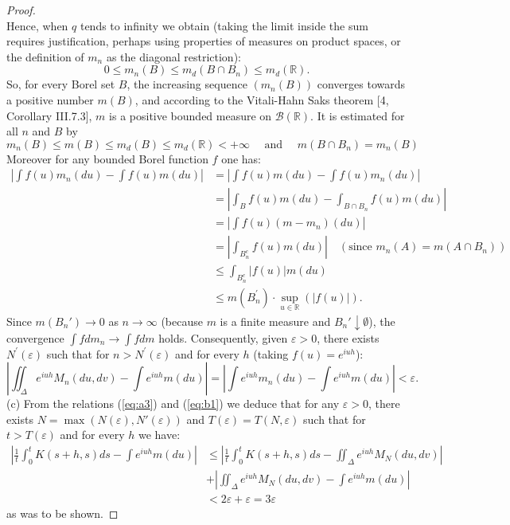 \documentclass{article}
\begin{document}
\begin{proof}
\[\]
Hence, when \(q\) tends to infinity we obtain (taking the limit inside the sum requires justification, perhaps using properties of measures on product spaces, or the definition of $m_n$ as the diagonal restriction):
\[
0 \leqslant m_{n}(B) \leqslant m_{d}\left(B \cap B_{n}\right) \leqslant m_{d}(\mathbb{R}) .
\]
So, for every Borel set \(B\), the increasing sequence \(\left(m_{n}(B)\right)\) converges towards a positive number \(m(B)\), and according to the Vitali-Hahn Saks theorem [4, Corollary III.7.3], \(m\) is a positive bounded measure on \(\mathscr{B}(\mathbb{R})\). It is estimated for all \(n\) and \(B\) by
\[
m_{n}(B) \leqslant m(B) \leqslant m_{d}(B) \leqslant m_{d}(\mathbb{R})<+\infty \quad \text { and } \quad m\left(B \cap B_{n}\right)=m_{n}(B)
\]
Moreover for any bounded Borel function \(f\) one has:
\[
\begin{aligned}
\left|\int f(u) m_{n}(d u)-\int f(u) m(d u)\right| & = \left|\int f(u) m(d u) - \int f(u) m_n(d u) \right| \\
& = \left| \int_{B} f(u) m(d u) - \int_{B \cap B_n} f(u) m(d u) \right| \\ %
& = \left| \int f(u) (m - m_n)(d u) \right| \\
& = \left| \int_{B_n^c} f(u) m(d u) \right| \quad (\text{since } m_n(A) = m(A \cap B_n)) \\
& \leqslant \int_{B_n^c} |f(u)| m(d u) \\
& \leqslant m\left(B_{n}^{\prime}\right) \cdot \sup_{u \in \mathbb{R}} (|f(u)|) .
\end{aligned}
\]
Since $m(B_n') \to 0$ as $n \to \infty$ (because $m$ is a finite measure and $B_n' \downarrow \emptyset$), the convergence $\int f dm_n \to \int f dm$ holds.
Consequently, given \(\varepsilon>0\), there exists \(N^{\prime}(\varepsilon)\) such that for \(n>N^{\prime}(\varepsilon)\) and for every \(h\) (taking \(f(u) = e^{iuh}\)):
\begin{equation} \label{eq:b1}
\left|\iint_{\Delta} e^{i u h} M_{n}(d u, d v)-\int e^{i u h} m(d u)\right| = \left|\int e^{i u h} m_{n}(d u)-\int e^{i u h} m(d u)\right| < \varepsilon .
\end{equation}
(c) From the relations (\ref{eq:a3}) and (\ref{eq:b1}) we deduce that for any \(\varepsilon>0\), there exists \(N = \max(N(\varepsilon), N'(\varepsilon))\) and \(T(\varepsilon) = T(N, \varepsilon)\) such that for \(t>T(\varepsilon)\) and for every \(h\) we have:
\[
\begin{aligned}
\left|\frac{1}{t} \int_{0}^{t} K(s+h, s) d s-\int e^{i u h} m(d u)\right| & \le \left|\frac{1}{t} \int_{0}^{t} K(s+h, s) d s-\iint_{\Delta} e^{i u h} M_{N}(d u, d v)\right| \\
& + \left|\iint_{\Delta} e^{i u h} M_{N}(d u, d v)-\int e^{i u h} m(d u)\right| \\
& < 2\varepsilon + \varepsilon = 3\varepsilon
\end{aligned}
\]
as was to be shown.
\end{proof}
\end{document}
